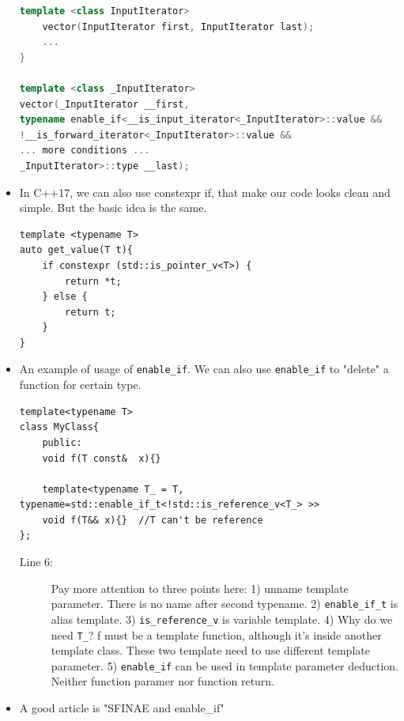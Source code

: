 \documentclass[a4paper,11pt,twoside]{book}
\begin{document}
\begin{itemize}
\begin{lstlisting}[frame=single, language=c++]
	template <class InputIterator>
	vector(InputIterator first, InputIterator last);
	...
}

template <class _InputIterator>
vector(_InputIterator __first,
typename enable_if<__is_input_iterator<_InputIterator>::value &&
!__is_forward_iterator<_InputIterator>::value &&
... more conditions ...
_InputIterator>::type __last);
\end{lstlisting}	

\item In C++17, we can also use constexpr if, that make our code looks clean and simple. But the basic idea is the same. 

\begin{lstlisting}[numbers=none]
template <typename T>
auto get_value(T t){
	if constexpr (std::is_pointer_v<T>) {
		return *t;
	} else {
		return t;
	}
}
\end{lstlisting}
	
	\item An example of usage of \texttt{enable\_if}. We can also use \texttt{enable\_if} to "delete" a function for certain type. 
\begin{lstlisting}
template<typename T>
class MyClass{
	public:
	void f(T const&  x){}
	
	template<typename T_ = T, typename=std::enable_if_t<!std::is_reference_v<T_> >>
	void f(T&& x){}  //T can't be reference 
};	
\end{lstlisting}
\begin{description}
	\item[Line 6:] Pay more attention to three points here: 
	1) unname template parameter. There is no name after second typename. 
	2) \texttt{enable\_if\_t} is alias template.
	3) \texttt{is\_reference\_v} is variable template. 
	4) Why do we need \texttt{T\_}? f must be a template function, although it's inside another template class. These two template need to use different template parameter. 
	5) \texttt{enable\_if} can be used in template parameter deduction. Neither function paramer nor function return.
	
\end{description}
	
	\item A good article is "SFINAE and enable\_if"
\end{itemize}
\end{document}
